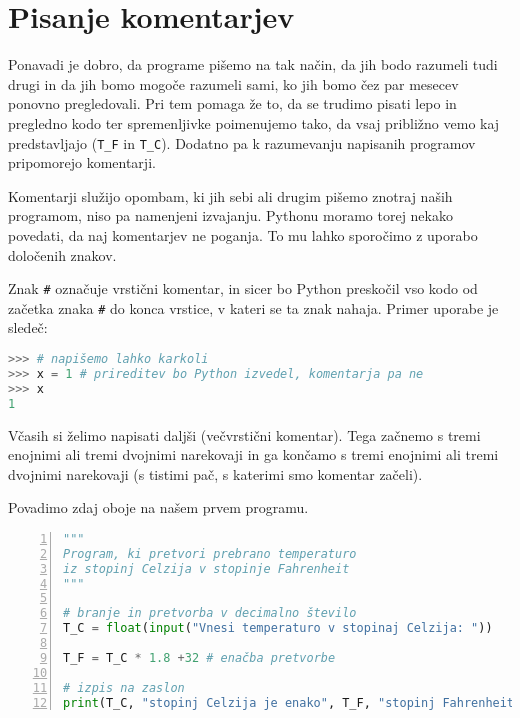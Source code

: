 \section{Pisanje komentarjev}
Ponavadi je dobro, da programe pišemo na tak način, da jih bodo razumeli tudi drugi in da jih bomo mogoče razumeli sami, ko jih bomo čez par mesecev ponovno  pregledovali. Pri tem pomaga že to, da se trudimo pisati lepo in pregledno kodo ter spremenljivke poimenujemo tako, da vsaj približno vemo kaj predstavljajo (\texttt{T\_F} in \texttt{T\_C}). Dodatno pa k razumevanju napisanih programov pripomorejo komentarji.

Komentarji služijo opombam, ki jih sebi ali drugim pišemo znotraj naših programom, niso pa namenjeni izvajanju. Pythonu moramo torej nekako povedati, da naj komentarjev ne poganja. To mu lahko sporočimo z uporabo določenih znakov. 

Znak \texttt{\#} označuje vrstični komentar, in sicer bo Python preskočil vso kodo od začetka znaka \texttt{\#} do konca vrstice, v kateri se ta znak nahaja. Primer uporabe je sledeč:
\begin{lstlisting}[language=Python, showstringspaces=false]
>>> # napišemo lahko karkoli
>>> x = 1 # prireditev bo Python izvedel, komentarja pa ne
>>> x
1
\end{lstlisting}

Včasih si želimo napisati daljši (večvrstični komentar). Tega začnemo s tremi enojnimi ali tremi dvojnimi narekovaji in ga končamo s tremi enojnimi ali tremi dvojnimi narekovaji (s tistimi pač, s katerimi smo komentar začeli).

Povadimo zdaj oboje na našem prvem programu.
\begin{lstlisting}[language=Python, showstringspaces=false,numbers=left]
"""
Program, ki pretvori prebrano temperaturo 
iz stopinj Celzija v stopinje Fahrenheit
"""

# branje in pretvorba v decimalno število
T_C = float(input("Vnesi temperaturo v stopinaj Celzija: ")) 

T_F = T_C * 1.8 +32 # enačba pretvorbe

# izpis na zaslon
print(T_C, "stopinj Celzija je enako", T_F, "stopinj Fahrenheit.") 
\end{lstlisting}



